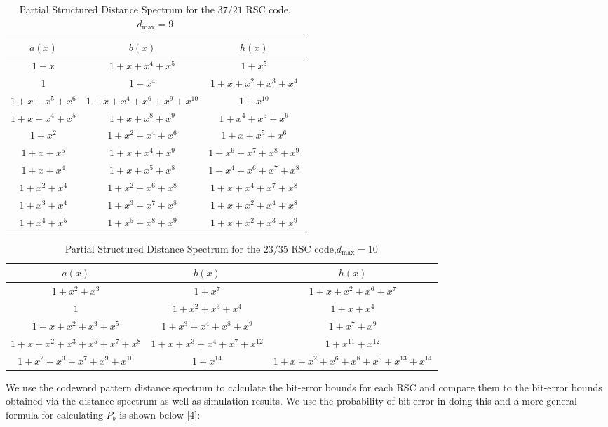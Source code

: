 \begin{table*}[h!]
 \caption{Partial Structured Distance Spectrum for the $37/21$ RSC code,$d_{\text{max}}=9$}
\centering
 \begin{tabular}{c c c} 
 \hline
 $a(x)$ & $b(x)$ & $h(x)$ \\ [0.5ex] 
 \hline\hline
$1+x$ & $1+x+x^{4}+x^5$ & $1+x^5$\\
\hline
$1$ & $1+x^4$ & $1+x+x^2+x^3+x^4$\\
\hline
$1+x+x^5+x^6$ & $1+x+x^4+x^6+x^9+x^{10}$ & $1+x^{10}$\\
\hline
$1+x+x^4+x^5$ & $1+x+x^8+x^9$ & $1+x^4+x^5+x^9$\\
\hline
$1+x^2$ & $1+x^2+x^4+x^6$ & $1+x+x^5+x^6$\\
\hline
$1+x+x^5$ & $1+x+x^4+x^9$ & $1+x^6+x^7+x^8+x^9$\\
\hline
$1+x+x^4$ & $1+x+x^5+x^8$ & $1+x^4+x^6+x^7+x^8$\\
\hline
$1+x^2+x^4$ & $1+x^2+x^6+x^8$ & $1+x+x^4+x^7+x^8$\\
\hline
$1+x^3+x^4$& $1+x^3+x^7+x^8$ & $1+x+x^2+x^4+x^8$\\
\hline
$1+x^4+x^5$ & $1+x^5+x^8+x^9$ & $1+x+x^2+x^3+x^9$\\
 \end{tabular}
 
 \label{novelTab14}
\end{table*}

\begin{table*}[h!]
 \caption{Partial Structured Distance Spectrum for the $23/35$ RSC code,$d_{\text{max}}=10$}
\centering
 \begin{tabular}{c c c} 
 \hline
 $a(x)$ & $b(x)$ & $h(x)$ \\ [0.5ex] 
 \hline\hline
$1+x^2+x^3$ & $1+x^7$ & $1+x+x^2+x^6+x^7$\\
\hline
$1$ & $1+x^2+x^3+x^4$ & $1+x+x^{4}$\\
\hline
$1+x+x^2+x^3+x^5$ & $1+x^3+x^4+x^8+x^9$ & $1+x^7+x^9$\\
\hline
$1+x+x^2+x^3+x^5+x^7+x^8$ & $1+x+x^3+x^4+x^7+x^{12}$ & $1+x^{11}+x^{12}$\\
\hline
$1+x^2+x^3+x^7+x^9+x^{10}$ & $1+x^{14}$ & $1+x+x^2+x^6+x^8+x^9+x^{13}+x^{14}$\\
 \end{tabular}
 
 \label{novelTab15}
\end{table*}
\newpage
We use the codeword pattern distance spectrum to calculate the bit-error bounds for each RSC and compare them to the bit-error bounds obtained via the distance spectrum as well as simulation results. We use the probability of bit-error in doing this and a more general formula for calculating $P_b$ is shown below [4]:

